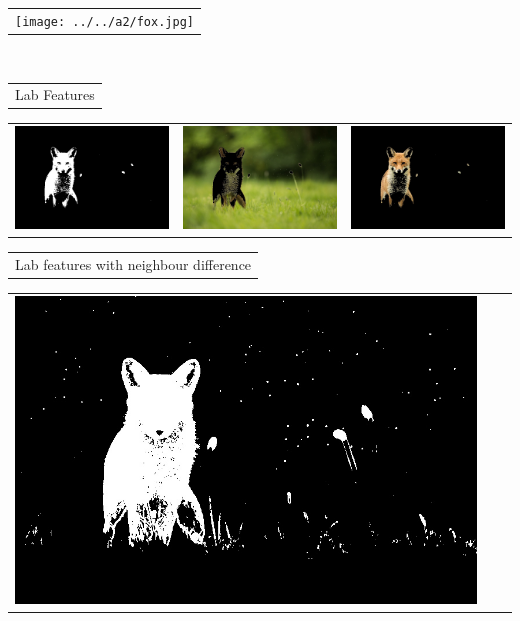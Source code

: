 \documentclass{article}
\begin{document}
\begin{center}
\begin{tabular}{c}
\texttt{[image: ../../a2/fox.jpg]}
\end{tabular}
\\
\begin{tabular}{c}

Lab Features \\
\end{tabular}
 \begin{tabular}{c c c} 

 \includegraphics[width=.37\linewidth]{../image-segmentation/output/Lab/fox_mask.jpg} & 
 
 \includegraphics[width=.37\linewidth]{../image-segmentation/output/Lab/fox_seg1.jpg} & \includegraphics[width=.37\linewidth]{../image-segmentation/output/Lab/fox_seg2.jpg} \\
  
 \end{tabular}
 \begin{tabular}{c}

Lab features with neighbour difference \\
\end{tabular}
 \begin{tabular}{c c c} 

 \includegraphics[width=.37\linewidth]{../image-segmentation/output/add-Lab-neighbor-diff-feature/fox_mask.jpg} & 
 

\end{tabular}
\end{center}
\end{document}

